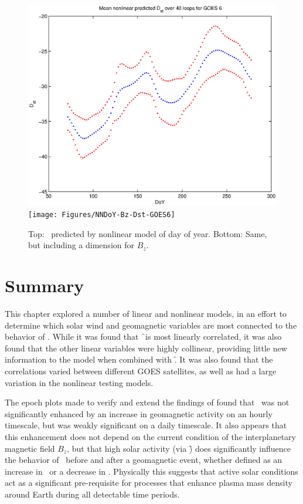 \begin{figure}[htp!]
	\centering
	\includegraphics[width=0.7\linewidth]{Figures/NNDoY-Dst-GOES6}	
	\texttt{[image: Figures/NNDoY-Bz-Dst-GOES6]}
	\caption{Top: \dst\ predicted by nonlinear model of day of year. Bottom: Same, but including a dimension for $B_z$.}
	\label{fig:DoYDst}
\end{figure}

\section{Summary}
This chapter explored a number of linear and nonlinear models, in an effort to determine which solar wind and geomagnetic variables are most connected to the behavior of \req. While it was found that \f\ is most linearly correlated, it was also found that the other linear variables were highly collinear, providing little new information to the model when combined with \f.  It was also found that the correlations varied between different GOES satellites, as well as had a large variation in the nonlinear testing models. 

The epoch plots made to verify and extend the findings of \cite{Takahashi2010SolarCycleVariation} found that \req\ was not significantly enhanced by an increase in geomagnetic activity on an hourly timescale, but was weakly significant on a daily timescale. It also appears that this enhancement does not depend on the current condition of the interplanetary magnetic field $B_z$, but that high solar activity (via \f) does significantly influence the behavior of \req\ before and after a geomagnetic event, whether defined as an increase in \req\ or a decrease in \dst. Physically this suggests that active solar conditions act as a significant pre-requisite for processes that enhance plasma mass density around Earth during all detectable time periods.


